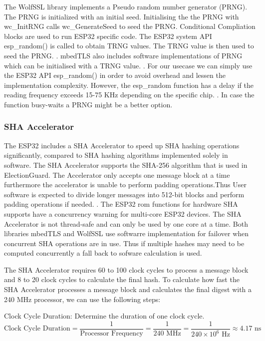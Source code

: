 The WolfSSL library implements a Pseudo random number generator (PRNG). The PRNG is initialized with an initial seed. Initialising the the PRNG with wc\_InitRNG calls wc\_GenerateSeed to seed the PRNG. Conditional Compliation blocks are used to run ESP32 specific code. The ESP32 system API esp\_random() is called to obtain TRNG values. The TRNG value is then used to seed the PRNG. \cite{esp32-ref}. mbedTLS also includes software implementations of PRNG which can be initialised with a TRNG value. \cite{esp32-ref}. For our usecase we can simply use the ESP32 API esp\_random() in order to avoid overhead and lessen the implementation complexity. However, the esp\_random function has a delay if the reading frequency exceeds 15-75 KHz depending on the specific chip. \cite{esp32-ref}. In case the function busy-waits a PRNG might be a better option. 


\subsubsection{SHA Accelerator}
The ESP32 includes a SHA Accelerator to speed up SHA hashing operations significantly, compared to SHA hashing algorithms implemented solely in software. \cite[589]{esp32-ref} The SHA Accelerator supports the SHA-256 algorithm that is used in ElectionGuard. The Accelerator only accepts one message block at a time furthermore the accelerator is unable to perform padding operations.Thus User software is expected to divide longer messages into 512-bit blocks and perform padding operations if needed. \cite[2]{esp32-series}. The ESP32 rom functions for hardware SHA supports have a concurrency warning for multi-core ESP32 devices. The SHA Accelerator is not thread-safe and can only be used by one core at a time. Both libraries mbedTLS and WolfSSL use softwarre implementation for failover when concurrent SHA operations are in use. Thus if multiple hashes may need to be computed concurrently a fall back to sofware calculation is used.


The SHA Accelerator requires 60 to 100 clock cycles to process a message block and 8 to 20 clock cycles to calculate the final hash. To calculate how fast the SHA Accelerator processes a message block and calculates the final digest with a 240 MHz processor, we can use the following steps:

Clock Cycle Duration: Determine the duration of one clock cycle.
\begin{equation}
\text{Clock Cycle Duration} = \frac{1}{\text{Processor Frequency}} = \frac{1}{240 \text{ MHz}} = \frac{1}{240 \times 10^6 \text{ Hz}} \approx 4.17 \text{ ns}
\end{equation}

